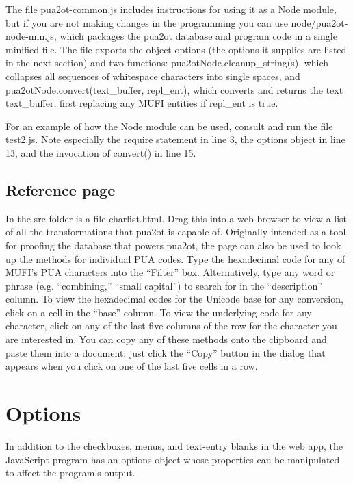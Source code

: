 \documentclass[12pt,letterpaper,openany]{article}
\newcommand\textSourceText[1]{{\color{GGOrange}\textsf{#1}}}
\newcommand{\pto}{\textsf{\color{myLightPurple}pua2ot}}
\begin{document}
The file \textSourceText{pua2ot-common.js} includes instructions for using it as
a Node module, but if you are not making changes in the programming you can use
\textSourceText{node/pua2ot-node-min.js}, which packages the {\pto}
database and program code in a single minified file. The file exports the object
\textSourceText{options} (the options it supplies are listed in the next section)
and two functions: \textSourceText{pua2otNode.cleanup\_string(s)}, which collapses
all sequences of whitespace characters into single spaces, and 
\textSourceText{pua2otNode.convert(text\_buffer, repl\_ent)}, which converts and returns
the text \textSourceText{text\_buffer}, first replacing any MUFI entities if
\textSourceText{repl\_ent} is true.

For an example of how the Node module can be used, consult and run the file 
\textSourceText{test2.js}. Note especially the \textSourceText{require} statement in 
line 3, the \textSourceText{options} object in line 13, and the invocation of 
\textSourceText{convert()} in line 15.


\subsection{Reference page}

In the \textSourceText{src} folder is a file \textSourceText{charlist.html}. Drag this 
into a web browser to view a list of all the transformations that {\pto} is capable
of. Originally intended as a tool for proofing the database that powers {\pto},
the page can also be used to look up the methods for individual PUA codes. Type the
hexadecimal code for any of MUFI's PUA characters into the “Filter” box. Alternatively,
type any word or phrase (e.g. “combining,” “small capital”) to search for in the 
“description” column. To view the hexadecimal codes for the Unicode base for any 
conversion, click on a cell in the “base” column. To view the underlying code for 
any character, click on any of the last five columns of the row for the character 
you are interested in. You can copy any of these methods onto the clipboard and 
paste them into a document: just click the “Copy” button in the dialog that appears
when you click on one of the last five cells in a row.


\section{Options}

In addition to the checkboxes, menus, and text-entry blanks in the web app, the
JavaScript program has an \textSourceText{options} object whose properties can be
manipulated to affect the program's output.
\end{document}
